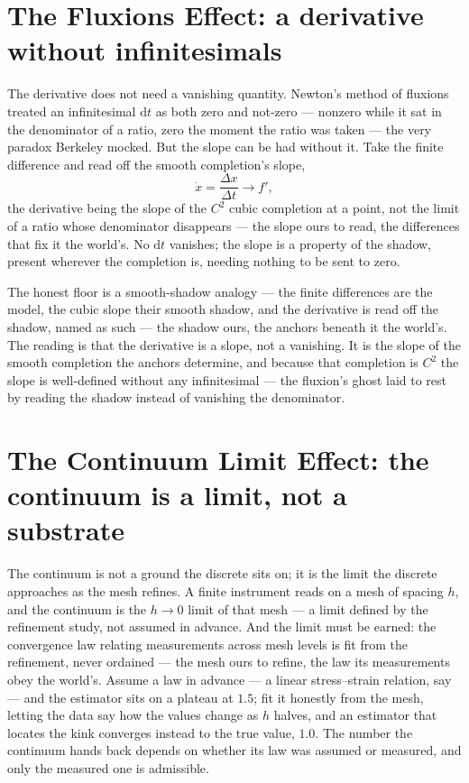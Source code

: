 \section{The Fluxions Effect: a derivative without infinitesimals}
\label{se:fluxions}

The derivative does not need a vanishing quantity. Newton's method of fluxions treated an infinitesimal $\mathrm{d}t$ as
both zero and not-zero --- nonzero while it sat in the denominator of a ratio, zero the moment the ratio was
taken --- the very paradox Berkeley mocked. But the slope can be had without it. Take the finite difference and
read off the smooth completion's slope,
\begin{equation}
  \dot x = \frac{\Delta x}{\Delta t} \longrightarrow f',
\end{equation}
the derivative being the slope of the $C^2$ cubic completion at a point, not the limit of a ratio whose
denominator disappears --- the slope ours to read, the differences that fix it the world's. No $\mathrm{d}t$
vanishes; the slope is a property of the shadow, present wherever the
completion is, needing nothing to be sent to zero.

The honest floor is a smooth-shadow analogy --- the finite differences are the model, the cubic slope their
smooth shadow, and the derivative is read off the shadow, named as such --- the shadow ours, the anchors
beneath it the world's. The reading is that the derivative is
a slope, not a vanishing. It is the slope of the smooth completion the anchors determine, and because that
completion is $C^2$ the slope is well-defined without any infinitesimal --- the fluxion's ghost laid to rest by
reading the shadow instead of vanishing the denominator.

\section{The Continuum Limit Effect: the continuum is a limit, not a substrate}
\label{se:continuum-limit}

The continuum is not a ground the discrete sits on; it is the limit the discrete approaches as the mesh
refines. A finite instrument reads on a mesh of spacing $h$, and the continuum is the $h \to 0$ limit of that
mesh --- a limit defined by the refinement study, not assumed in advance. And the limit must be earned: the
convergence law relating measurements across mesh levels is fit from the refinement, never ordained --- the
mesh ours to refine, the law its measurements obey the world's. Assume a law
in advance --- a linear stress--strain relation, say --- and the estimator sits on a plateau at $1.5$; fit it
honestly from the mesh, letting the data say how the values change as $h$ halves, and an estimator that
locates the kink converges instead to the true value, $1.0$. The number the continuum hands back depends on whether
its law was assumed or measured, and only the measured one is admissible.

